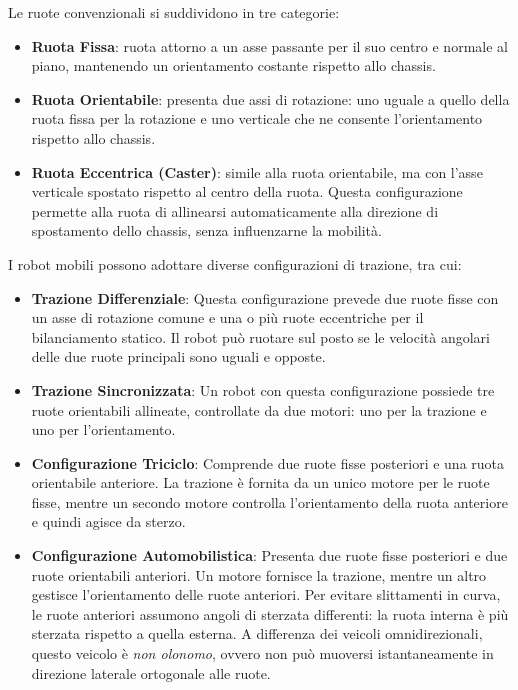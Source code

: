 \documentclass[11pt, a4paper]{report}
\begin{document}
Le ruote convenzionali si suddividono in tre categorie:
\begin{itemize}
    \item \textbf{Ruota Fissa}: ruota attorno a un asse passante per il suo centro e normale al piano, mantenendo un orientamento costante rispetto allo chassis.

    \item \textbf{Ruota Orientabile}: presenta due assi di rotazione: uno uguale a quello della ruota fissa per la rotazione e uno verticale che ne consente l'orientamento rispetto allo chassis.

    \item \textbf{Ruota Eccentrica (Caster)}: simile alla ruota orientabile, ma con l'asse verticale spostato rispetto al centro della ruota. Questa configurazione permette alla ruota di allinearsi automaticamente alla direzione di spostamento dello chassis, senza influenzarne la mobilità.
\end{itemize}

I robot mobili possono adottare diverse configurazioni di trazione, tra cui:
\begin{itemize}
    \item \textbf{Trazione Differenziale}: Questa configurazione prevede due ruote fisse con un asse di rotazione comune e una o più ruote eccentriche per il bilanciamento statico. Il robot può ruotare sul posto se le velocità angolari delle due ruote principali sono uguali e opposte.

    \item \textbf{Trazione Sincronizzata}: Un robot con questa configurazione possiede tre ruote orientabili allineate, controllate da due motori: uno per la trazione e uno per l'orientamento.

    \item \textbf{Configurazione Triciclo}: Comprende due ruote fisse posteriori e una ruota orientabile anteriore. La trazione è fornita da un unico motore per le ruote fisse, mentre un secondo motore controlla l'orientamento della ruota anteriore e quindi agisce da sterzo.

    \item \textbf{Configurazione Automobilistica}: Presenta due ruote fisse posteriori e due ruote orientabili anteriori. Un motore fornisce la trazione, mentre un altro gestisce l'orientamento delle ruote anteriori. Per evitare slittamenti in curva, le ruote anteriori assumono angoli di sterzata differenti: la ruota interna è più sterzata rispetto a quella esterna. A differenza dei veicoli omnidirezionali, questo veicolo è \textit{non olonomo}, ovvero non può muoversi istantaneamente in direzione laterale ortogonale alle ruote.
\end{itemize}
\end{document}
